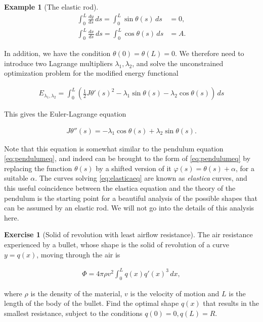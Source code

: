 \documentclass[11pt]{report}
\theoremstyle{plain}
\theoremstyle{definition}
\newtheorem{example}[thm]{Example}
\newtheorem{xexercise}[thm]{Exercise}
\begin{document}
\begin{example}[The elastic rod]
\begin{align*}
\int_0^L \frac{dy}{ds}\,ds = \int_0^L \sin\theta(s)\,ds &= 0, \\
\int_0^L \frac{dx}{ds}\,ds = \int_0^L \cos\theta(s)\,ds &= A.
\end{align*}

\noindent In addition, we have the condition
$\theta(0)=\theta(L)=0$. We therefore need to
introduce two Lagrange multipliers
$\lambda_1, \lambda_2$, and solve the unconstrained
optimization problem for the modified energy
functional

\begin{align*}
E_{\lambda_1, \lambda_2} = \int_0^L \left(\tfrac12 J \theta'(s)^2 - \lambda_1 \sin\theta(s) - \lambda_2 \cos\theta(s)\right)\,ds
\end{align*}

\noindent This gives the Euler-Lagrange equation

\begin{equation*} \tag{17}\label{eq:elasticaeq}
\begin{split}
J \theta''(s) = -\lambda_1 \cos \theta(s) + \lambda_2 \sin\theta(s).
\end{split}
\end{equation*}

\noindent Note that this equation is somewhat similar to the
pendulum equation \eqref{eq:pendulumeq}, and indeed can be
brought to the form of \eqref{eq:pendulumeq} by replacing
the function $\theta(s)$ by a shifted version of it
$\varphi(s)=\theta(s)+\alpha$, for a suitable
$\alpha$. The curves solving \eqref{eq:elasticaeq} are
known as \emph{elastica} curves, and this useful
coincidence between the elastica equation and the
theory of the pendulum is the starting point for a
beautiful analysis of the possible shapes that can be
assumed by an elastic rod. We will not go into the
details of this analysis here.
\end{example}

\begin{xexercise}[Solid of revolution with least airflow resistance]
The air resistance experienced by a bullet, whose
shape is the solid of revolution of a curve $y=q(x)$,
moving through the air is

\begin{align*}
\Phi = 4\pi \rho v^2 \int_0^L q(x) q'(x)^3\,dx,
\end{align*}

\noindent where $\rho$ is the density of the material, $v$ is
the velocity of motion and $L$ is the length of the
body of the bullet. Find the optimal shape $q(x)$ that
results in the smallest resistance, subject to the
conditions $q(0)=0, q(L)=R$.
\end{xexercise}
\end{document}
